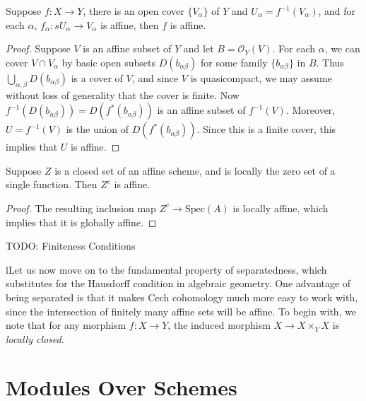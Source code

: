 \begin{lemma}
    Suppose $f: X \to Y$, there is an open cover $\{ V_\alpha \}$ of $Y$ and $U_\alpha = f^{-1}(V_\alpha)$, and for each $\alpha$, $f_\alpha: sU_\alpha \to V_\alpha$ is affine, then $f$ is affine.
\end{lemma}
\begin{proof}
    Suppose $V$ is an affine subset of $Y$ and let $B = \mathcal{O}_Y(V)$. For each $\alpha$, we can cover $V \cap V_\alpha$ by basic open subsets $D(b_{\alpha \beta})$ for some family $\{ b_{\alpha \beta} \}$ in $B$. Thus $\bigcup_{\alpha, \beta} D(b_{\alpha \beta})$ is a cover of $V$, and since $V$ is quasicompact, we may assume without loss of generality that the cover is finite. Now $f^{-1}(D(b_{\alpha \beta})) = D(f^*(b_{\alpha \beta}))$ is an affine subset of $f^{-1}(V)$. Moreover, $U = f^{-1}(V)$ is the union of $D(f^*(b_{\alpha \beta}))$. Since this is a finite cover, this implies that $U$ is affine.
\end{proof}

\begin{corollary}
    Suppose $Z$ is a closed set of an affine scheme, and is locally the zero set of a single function. Then $Z^c$ is affine.
\end{corollary}
\begin{proof}
    The resulting inclusion map $Z^c \to \text{Spec}(A)$ is locally affine, which implies that it is globally affine.
\end{proof}

TODO: Finiteness Conditions

lLet us now move on to the fundamental property of separatedness, which substitutes for the Hausdorff condition in algebraic geometry. One advantage of being separated is that it makes Cech cohomology much more easy to work with, since the intersection of finitely many affine sets will be affine. To begin with, we note that for any morphism $f: X \to Y$, the induced morphism $X \to X \times_Y X$ is \emph{locally closed}.
















\section{Modules Over Schemes}

